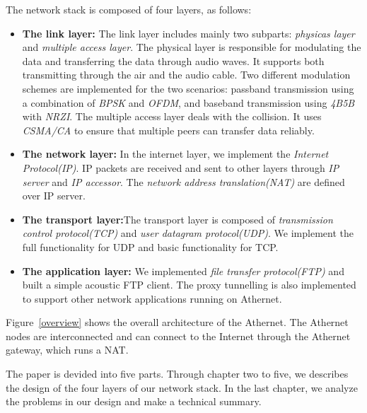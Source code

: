 The network stack is composed of four layers, as follows:
\begin{itemize}
  \item \textbf{The link layer:} The link layer includes mainly two subparts:  \emph{physicas layer} and \emph{multiple access layer}. The physical layer is responsible for modulating the data and transferring the data through audio waves. It supports both transmitting through the air and the audio cable. Two different modulation schemes are implemented for the two scenarios: passband transmission using a combination of \emph{BPSK} and \emph{OFDM}, and baseband transmission using \emph{4B5B} with \emph{NRZI}. The multiple access layer deals with the collision. It uses \emph{CSMA/CA} to ensure that multiple peers can transfer data reliably.
  \item \textbf{The network layer:} In the internet layer, we implement the  \emph{Internet Protocol(IP)}. IP packets are received and sent to other layers through \emph{IP server} and \emph{IP accessor}. The \emph{network address translation(NAT)} are defined over IP server.
  \item \textbf{The transport layer:}The transport layer is composed of \emph{transmission control protocol(TCP)} and \emph{user datagram protocol(UDP)}. We implement the full functionality for UDP and basic functionality for TCP.
  \item \textbf{The application layer:} We implemented \emph{file transfer protocol(FTP)} and built a simple acoustic FTP client. The proxy tunnelling is also implemented to support other network applications running on Athernet.
\end{itemize}
Figure~\ref{overview} shows the overall architecture of the Athernet. The Athernet nodes are interconnected and can connect to the Internet through the Athernet gateway, which runs a NAT.\par
The paper is devided into five parts. Through chapter two to five, we describes the design of the four layers of our network stack. In the last chapter, we analyze the problems in our design and make a technical summary.
